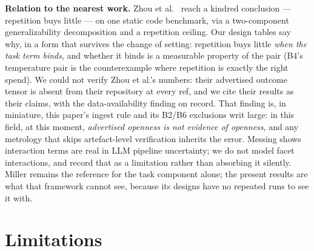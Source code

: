 \documentclass[11pt]{article}
\begin{document}
\textbf{Relation to the nearest work.} Zhou et al.\ \cite{zhou2026}
reach a kindred conclusion --- repetition buys little --- on one
static code benchmark, via a two-component generalizability
decomposition and a repetition ceiling. Our design tables say why, in
a form that survives the change of setting: repetition buys little
\emph{when the task term binds}, and whether it binds is a measurable
property of the pair (B4's temperature pair is the counterexample
where repetition is exactly the right spend). We could not verify
Zhou et al.'s numbers: their advertised outcome tensor is absent from
their repository at every ref, and we cite their results as their
claims, with the data-availability finding on record. That finding
is, in miniature, this paper's ingest rule and its B2/B6 exclusions
writ large: in this field, at this moment, \emph{advertised openness
is not evidence of openness}, and any metrology that skips
artefact-level verification inherits the error. Messing
\cite{messing2026} shows interaction terms are real in LLM pipeline
uncertainty; we do not model facet interactions, and record that as a
limitation rather than absorbing it silently. Miller
\cite{miller2024} remains the reference for the task component alone;
the present results are what that framework cannot see, because its
designs have no repeated runs to see it with.

\section{Limitations}
\label{sec:limits}
\end{document}
